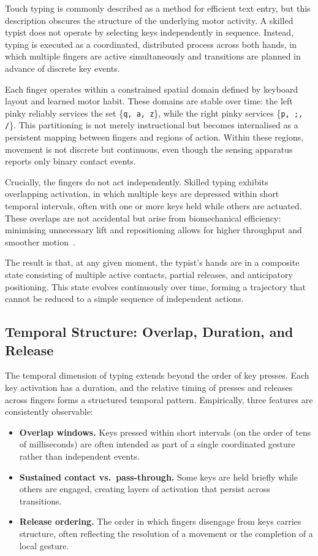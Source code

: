 \documentclass[11pt, a4paper]{article}
\begin{document}
Touch typing is commonly described as a method for efficient text entry,
but this description obscures the structure of the underlying motor
activity. A skilled typist does not operate by selecting keys
independently in sequence. Instead, typing is executed as a coordinated,
distributed process across both hands, in which multiple fingers are
active simultaneously and transitions are planned in advance of discrete
key events.

Each finger operates within a constrained spatial domain defined by
keyboard layout and learned motor habit. These domains are stable over
time: the left pinky reliably services the set \{\texttt{q, a, z}\},
while the right pinky services \{\texttt{p, ;, /}\}. This partitioning
is not merely instructional but becomes internalised as a persistent
mapping between fingers and regions of action. Within these regions,
movement is not discrete but continuous, even though the sensing
apparatus reports only binary contact events.

Crucially, the fingers do not act independently. Skilled typing exhibits
overlapping activation, in which multiple keys are depressed within short
temporal intervals, often with one or more keys held while others are
actuated. These overlaps are not accidental but arise from biomechanical
efficiency: minimising unnecessary lift and repositioning allows for
higher throughput and smoother motion~\cite{schieber2001}.

The result is that, at any given moment, the typist's hands are in a
composite state consisting of multiple active contacts, partial releases,
and anticipatory positioning. This state evolves continuously over time,
forming a trajectory that cannot be reduced to a simple sequence of
independent actions.

\subsection{Temporal Structure: Overlap, Duration, and Release}

The temporal dimension of typing extends beyond the order of key presses.
Each key activation has a duration, and the relative timing of presses
and releases across fingers forms a structured temporal pattern.
Empirically, three features are consistently observable:

\begin{itemize}[leftmargin=2em]
  \item \textbf{Overlap windows.} Keys pressed within short intervals (on
    the order of tens of milliseconds) are often intended as part of a
    single coordinated gesture rather than independent events.
  \item \textbf{Sustained contact vs.\ pass-through.} Some keys are held
    briefly while others are engaged, creating layers of activation that
    persist across transitions.
  \item \textbf{Release ordering.} The order in which fingers disengage
    from keys carries structure, often reflecting the resolution of a
    movement or the completion of a local gesture.
\end{itemize}
\end{document}
